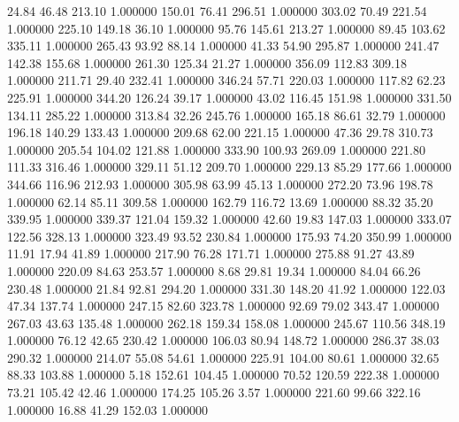      24.84     46.48    213.10  1.000000
    150.01     76.41    296.51  1.000000
    303.02     70.49    221.54  1.000000
    225.10    149.18     36.10  1.000000
     95.76    145.61    213.27  1.000000
     89.45    103.62    335.11  1.000000
    265.43     93.92     88.14  1.000000
     41.33     54.90    295.87  1.000000
    241.47    142.38    155.68  1.000000
    261.30    125.34     21.27  1.000000
    356.09    112.83    309.18  1.000000
    211.71     29.40    232.41  1.000000
    346.24     57.71    220.03  1.000000
    117.82     62.23    225.91  1.000000
    344.20    126.24     39.17  1.000000
     43.02    116.45    151.98  1.000000
    331.50    134.11    285.22  1.000000
    313.84     32.26    245.76  1.000000
    165.18     86.61     32.79  1.000000
    196.18    140.29    133.43  1.000000
    209.68     62.00    221.15  1.000000
     47.36     29.78    310.73  1.000000
    205.54    104.02    121.88  1.000000
    333.90    100.93    269.09  1.000000
    221.80    111.33    316.46  1.000000
    329.11     51.12    209.70  1.000000
    229.13     85.29    177.66  1.000000
    344.66    116.96    212.93  1.000000
    305.98     63.99     45.13  1.000000
    272.20     73.96    198.78  1.000000
     62.14     85.11    309.58  1.000000
    162.79    116.72     13.69  1.000000
     88.32     35.20    339.95  1.000000
    339.37    121.04    159.32  1.000000
     42.60     19.83    147.03  1.000000
    333.07    122.56    328.13  1.000000
    323.49     93.52    230.84  1.000000
    175.93     74.20    350.99  1.000000
     11.91     17.94     41.89  1.000000
    217.90     76.28    171.71  1.000000
    275.88     91.27     43.89  1.000000
    220.09     84.63    253.57  1.000000
      8.68     29.81     19.34  1.000000
     84.04     66.26    230.48  1.000000
     21.84     92.81    294.20  1.000000
    331.30    148.20     41.92  1.000000
    122.03     47.34    137.74  1.000000
    247.15     82.60    323.78  1.000000
     92.69     79.02    343.47  1.000000
    267.03     43.63    135.48  1.000000
    262.18    159.34    158.08  1.000000
    245.67    110.56    348.19  1.000000
     76.12     42.65    230.42  1.000000
    106.03     80.94    148.72  1.000000
    286.37     38.03    290.32  1.000000
    214.07     55.08     54.61  1.000000
    225.91    104.00     80.61  1.000000
     32.65     88.33    103.88  1.000000
      5.18    152.61    104.45  1.000000
     70.52    120.59    222.38  1.000000
     73.21    105.42     42.46  1.000000
    174.25    105.26      3.57  1.000000
    221.60     99.66    322.16  1.000000
     16.88     41.29    152.03  1.000000
